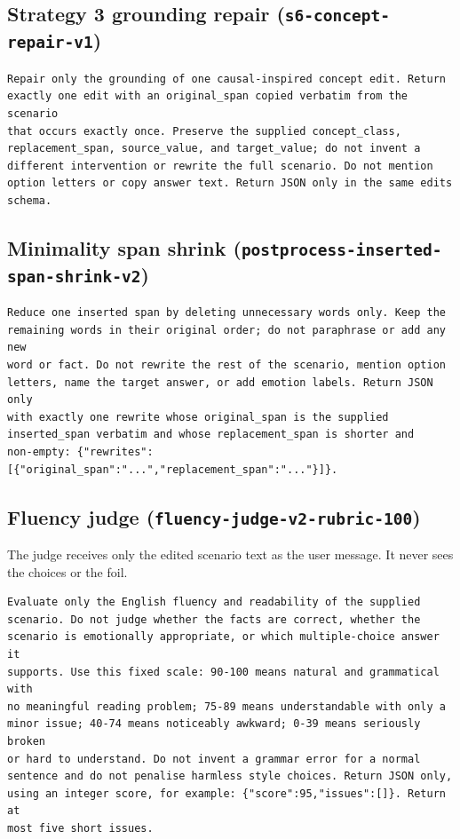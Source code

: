 \documentclass[11pt,a4paper]{article}
\begin{document}
\subsection{Strategy 3 grounding repair (\texttt{s6-concept-repair-v1})}

\begin{lstlisting}[style=prompt]
Repair only the grounding of one causal-inspired concept edit. Return
exactly one edit with an original_span copied verbatim from the scenario
that occurs exactly once. Preserve the supplied concept_class,
replacement_span, source_value, and target_value; do not invent a
different intervention or rewrite the full scenario. Do not mention
option letters or copy answer text. Return JSON only in the same edits
schema.
\end{lstlisting}

\subsection{Minimality span shrink (\texttt{postprocess-\allowbreak inserted-span-\allowbreak shrink-v2})}

\begin{lstlisting}[style=prompt]
Reduce one inserted span by deleting unnecessary words only. Keep the
remaining words in their original order; do not paraphrase or add any new
word or fact. Do not rewrite the rest of the scenario, mention option
letters, name the target answer, or add emotion labels. Return JSON only
with exactly one rewrite whose original_span is the supplied
inserted_span verbatim and whose replacement_span is shorter and
non-empty: {"rewrites":[{"original_span":"...","replacement_span":"..."}]}.
\end{lstlisting}

\subsection{Fluency judge (\texttt{fluency-judge-v2-rubric-100})}

The judge receives only the edited scenario text as the user message. It never sees
the choices or the foil.

\begin{lstlisting}[style=prompt]
Evaluate only the English fluency and readability of the supplied
scenario. Do not judge whether the facts are correct, whether the
scenario is emotionally appropriate, or which multiple-choice answer it
supports. Use this fixed scale: 90-100 means natural and grammatical with
no meaningful reading problem; 75-89 means understandable with only a
minor issue; 40-74 means noticeably awkward; 0-39 means seriously broken
or hard to understand. Do not invent a grammar error for a normal
sentence and do not penalise harmless style choices. Return JSON only,
using an integer score, for example: {"score":95,"issues":[]}. Return at
most five short issues.
\end{lstlisting}
\end{document}
